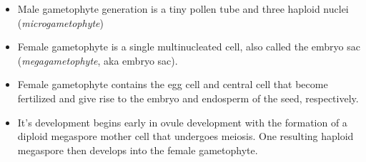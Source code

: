 \documentclass[11pt,ignorenonframetext,aspectratio=169]{beamer}
\providecommand{\tightlist}{%
  \setlength{\itemsep}{0pt}\setlength{\parskip}{0pt}}
\begin{document}
\begin{frame}{}
\protect\hypertarget{section-1}{}
\begin{itemize}
\tightlist
\item
  Male gametophyte generation is a tiny pollen tube and three haploid
  nuclei (\emph{microgametophyte})
\item
  Female gametophyte is a single multinucleated cell, also called the
  embryo sac (\emph{megagametophyte}, aka embryo sac).
\item
  Female gametophyte contains the egg cell and central cell that become
  fertilized and give rise to the embryo and endosperm of the seed,
  respectively.
\item
  It's development begins early in ovule development with the formation
  of a diploid megaspore mother cell that undergoes meiosis. One
  resulting haploid megaspore then develops into the female gametophyte.
\end{itemize}
\end{frame}
\end{document}
